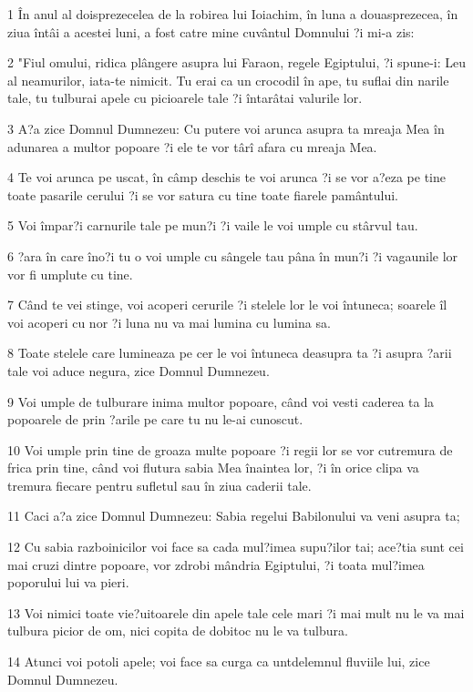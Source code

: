 \par 1 În anul al doisprezecelea de la robirea lui Ioiachim, în luna a douasprezecea, în ziua întâi a acestei luni, a fost catre mine cuvântul Domnului ?i mi-a zis:
\par 2 "Fiul omului, ridica plângere asupra lui Faraon, regele Egiptului, ?i spune-i: Leu al neamurilor, iata-te nimicit. Tu erai ca un crocodil în ape, tu suflai din narile tale, tu tulburai apele cu picioarele tale ?i întarâtai valurile lor.
\par 3 A?a zice Domnul Dumnezeu: Cu putere voi arunca asupra ta mreaja Mea în adunarea a multor popoare ?i ele te vor târî afara cu mreaja Mea.
\par 4 Te voi arunca pe uscat, în câmp deschis te voi arunca ?i se vor a?eza pe tine toate pasarile cerului ?i se vor satura cu tine toate fiarele pamântului.
\par 5 Voi împar?i carnurile tale pe mun?i ?i vaile le voi umple cu stârvul tau.
\par 6 ?ara în care îno?i tu o voi umple cu sângele tau pâna în mun?i ?i vagaunile lor vor fi umplute cu tine.
\par 7 Când te vei stinge, voi acoperi cerurile ?i stelele lor le voi întuneca; soarele îl voi acoperi cu nor ?i luna nu va mai lumina cu lumina sa.
\par 8 Toate stelele care lumineaza pe cer le voi întuneca deasupra ta ?i asupra ?arii tale voi aduce negura, zice Domnul Dumnezeu.
\par 9 Voi umple de tulburare inima multor popoare, când voi vesti caderea ta la popoarele de prin ?arile pe care tu nu le-ai cunoscut.
\par 10 Voi umple prin tine de groaza multe popoare ?i regii lor se vor cutremura de frica prin tine, când voi flutura sabia Mea înaintea lor, ?i în orice clipa va tremura fiecare pentru sufletul sau în ziua caderii tale.
\par 11 Caci a?a zice Domnul Dumnezeu: Sabia regelui Babilonului va veni asupra ta;
\par 12 Cu sabia razboinicilor voi face sa cada mul?imea supu?ilor tai; ace?tia sunt cei mai cruzi dintre popoare, vor zdrobi mândria Egiptului, ?i toata mul?imea poporului lui va pieri.
\par 13 Voi nimici toate vie?uitoarele din apele tale cele mari ?i mai mult nu le va mai tulbura picior de om, nici copita de dobitoc nu le va tulbura.
\par 14 Atunci voi potoli apele; voi face sa curga ca untdelemnul fluviile lui, zice Domnul Dumnezeu.
